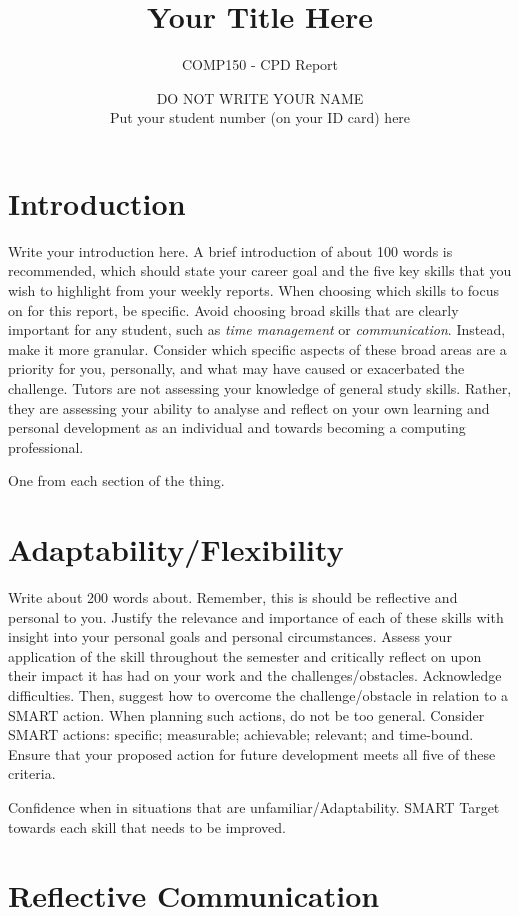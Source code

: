 \documentclass{scrartcl}
\title{Your Title Here}
\subtitle{COMP150 - CPD Report}
\author{DO NOT WRITE YOUR NAME\\Put your student number (on your ID card) here}
\begin{document}
\maketitle

\section{Introduction}

Write your introduction here. A brief introduction of about 100 words is recommended, which should state your career goal and the five key skills that you wish to highlight from your weekly reports. When choosing which skills to focus on for this report, be specific. Avoid choosing broad skills that are clearly important for any student, such as \textit{time management} or \textit{communication}. Instead, make it more granular. Consider which specific aspects of these broad areas are a priority for you, personally, and what may have caused or exacerbated the challenge. Tutors are not assessing your knowledge of general study skills. Rather, they are assessing your ability to analyse and reflect on your own learning and personal development as an individual and towards becoming a computing professional. 

One from each section of the thing.

\section{Adaptability/Flexibility}

Write about 200 words about. Remember, this is should be reflective and personal to you. Justify the relevance and importance of each of these skills with insight into your personal goals and personal circumstances. Assess your application of the skill throughout the semester and critically reflect on upon their impact it has had on your work and the challenges/obstacles. Acknowledge difficulties. Then, suggest how to overcome the challenge/obstacle in relation to a SMART action. When planning such actions, do not be too general. Consider SMART actions:
specific; measurable; achievable; relevant; and time-bound. Ensure that your proposed action for future development meets all five of these criteria.

Confidence when in situations that are unfamiliar/Adaptability. SMART Target towards each skill that needs to be improved.

\section{Reflective Communication}
\end{document}
